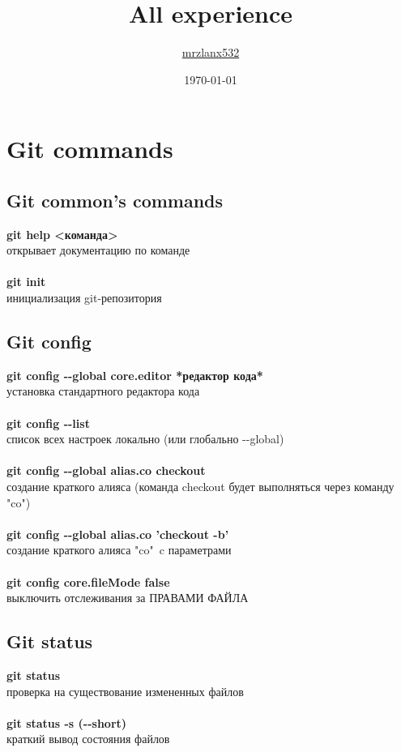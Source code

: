 \documentclass[a4paper, 12px]{report}
\author{ \href{https://github.com/mrzlanx532}{mrzlanx532}}
\title{All experience}
\date{\today}
\begin{document}
	
\maketitle

\tableofcontents{}
\clearpage 

\chapter{Git commands}

\section{Git common's commands}


\textbf{git help <команда>}\\открывает документацию по команде\\\\
\textbf{git init}\\инициализация git-репозитория


\section{Git config}

\textbf{git config -\--global core.editor *редактор кода*}\\ установка стандартного редактора кода\\\\
\textbf{git config -\--list}\\список всех настроек локально (или глобально -\--global)\\\\
\textbf{git config -\--global alias.co checkout}\\создание краткого алияса (команда checkout будет выполняться через команду "co")\\\\
\textbf{git config -\--global alias.co 'checkout -b'}\\создание краткого алияса "co"\ c параметрами\\\\
\textbf{git config core.fileMode false}\\выключить отслеживания за ПРАВАМИ ФАЙЛА

\section{Git status}

\textbf{git status}\\проверка на существование измененных файлов\\\\
\textbf{git status -s (-\--short)}\\краткий вывод состояния файлов
\end{document}
